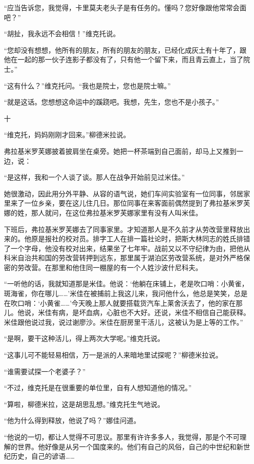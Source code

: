 “应当告诉您，我觉得，卡里莫夫老头子是有任务的。懂吗？您好像跟他常常会面吧？”

“胡扯，我永远不会相信！”维克托说。

“您却没有想想，他所有的朋友，所有的朋友的朋友，已经化成灰土有十年了，跟他在一起的那一伙子连影子都没有了，只有他一个留下来，而且青云直上，当了院士。”

“这有什么？”维克托问。“我也是院士，您也是院士嘛。”

“就是这话。您想想这命运中的蹊跷吧。我想，先生，您也不是小孩子。”

十

“维克托，妈妈刚刚才回来。”柳德米拉说。

弗拉基米罗芙娜披着披肩坐在桌旁。她把一杯茶端到自己面前，却马上又推到一边，说：

“是这样，我和一个人谈了谈。那人在战争开始前见过米佳。”

她很激动，因此用分外平静、从容的语气说，她们车间实验室有一位同事，邻居家里来了一位乡亲，要在这儿住几日。那位同事在来客面前偶然提到了弗拉基米罗芙娜的姓，那人就问，在这位弗拉基米罗芙娜家里有没有人叫米佳。

下班后，弗拉基米罗芙娜去了同事家里。才知道那人是不久前才从劳改营里释放出来的。他原是报社的校对员。排字工人在排一篇社论时，把斯大林同志的姓氏排错了一个字母，他没有校对出来，结果坐了七年牢。战前又以不守纪律为由，把他从科米自治共和国的劳改营转押到远东，那里属于湖泊区劳改营系统，是对外严格保密的劳改营。在那里和他住同一棚屋的有一个人姓沙波什尼科夫。

“一听他的话，我就知道那是米佳。他说：‘他躺在床铺上，老是吹口哨：小黄雀，斑海雀，你在哪儿……’米佳在被捕前上我这儿来，我问他什么，他总是笑笑，总是在吹口哨：‘小黄雀……’今天晚上那人就要搭载货汽车上莱舍沃去了，他的家在那儿。他说，米佳有病，是坏血病，心脏也不大好。还说，米佳不相信自己能获释。米佳跟他说过我，说过谢廖沙。米佳在厨房里干活儿，这被认为是上等的工作。”

“是啊，要干这种活儿，得上两次大学呢。”维克托说。

“这事儿可不能轻易相信，万一是派的人来暗地里试探呢？”柳德米拉说。

“谁需要试探一个老婆子？”

“不过，维克托是在很重要的单位里，自有人想知道他的情况。”

“算啦，柳德米拉，这是胡思乱想。”维克托生气地说。

“他为什么得到释放，他说了吗？”娜佳问道。

“他说的一切，都让人觉得不可思议。那里有许许多多人，我觉得，那是个不可理解的世界。他好像是从另一个国度来的。他们有自己的风俗，自己的中世纪和新世纪历史，自己的谚语……


